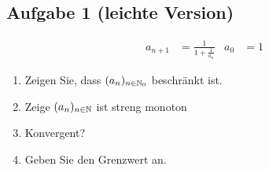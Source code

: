 \subsection{Aufgabe 1 (leichte Version)}
\newcommand{\redkleiner}{\color{red}<\color{black}}
\begin{align*}
    a_{n+1} &= \frac{1}{1 + \frac{1}{a_n}} & a_0 &= 1
\end{align*}

\begin{enumerate}[label=\alph*)]
    \item Zeigen Sie, dass $(a_n)_{n \in \mathbb N_0}$ beschränkt ist.
    \item Zeige $(a_n)_{n \in \mathbb N}$ ist streng monoton
    \item Konvergent?
    \item Geben Sie den Grenzwert an.
\end{enumerate}


